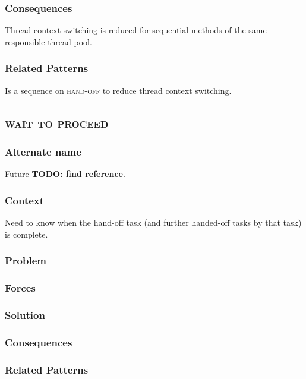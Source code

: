 \documentclass[prodmode]{style/acmlarge}
\begin{document}
\subsubsection*{Consequences} Thread context-switching is reduced for sequential
methods of the same responsible thread pool.

\subsubsection*{Related Patterns} Is a sequence on \textsc{hand-off} to reduce
thread context switching.



\subsection{\textsc{\textbf{wait to proceed}}}

\subsubsection*{Alternate name} Future \textbf{TODO: find reference}.

\subsubsection*{Context} Need to know when the hand-off task (and further
handed-off tasks by that task) is complete.

\subsubsection*{Problem}

\subsubsection*{Forces}

\subsubsection*{Solution}

\subsubsection*{Consequences}

\subsubsection*{Related Patterns}
\end{document}
